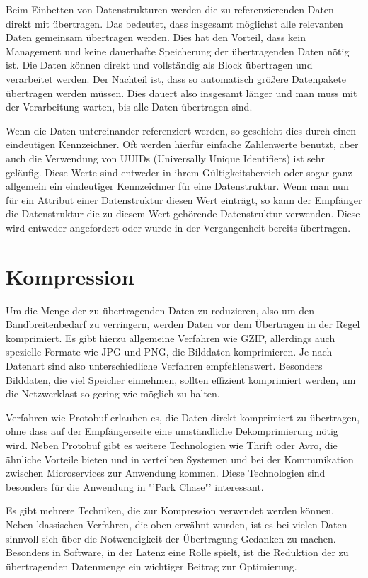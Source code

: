 Beim Einbetten von Datenstrukturen werden die zu referenzierenden Daten direkt mit übertragen. Das bedeutet, dass insgesamt möglichst alle relevanten Daten gemeinsam übertragen werden. Dies hat den Vorteil, dass kein Management und keine dauerhafte Speicherung der übertragenden Daten nötig ist. Die Daten können direkt und vollständig als Block übertragen und verarbeitet werden. Der Nachteil ist, dass so automatisch größere Datenpakete übertragen werden müssen. Dies dauert also insgesamt länger und man muss mit der Verarbeitung warten, bis alle Daten übertragen sind.

Wenn die Daten untereinander referenziert werden, so geschieht dies durch einen eindeutigen Kennzeichner. Oft werden hierfür einfache Zahlenwerte benutzt, aber auch die Verwendung von UUIDs (Universally Unique Identifiers) ist sehr geläufig. Diese Werte sind entweder in ihrem Gültigkeitsbereich oder sogar ganz allgemein ein eindeutiger Kennzeichner für eine Datenstruktur. Wenn man nun für ein Attribut einer Datenstruktur diesen Wert einträgt, so kann der Empfänger die Datenstruktur die zu diesem Wert gehörende Datenstruktur verwenden. Diese wird entweder angefordert oder wurde in der Vergangenheit bereits übertragen.

\section{Kompression}

Um die Menge der zu übertragenden Daten zu reduzieren, also um den Bandbreitenbedarf zu verringern, werden Daten vor dem Übertragen in der Regel komprimiert. Es gibt hierzu allgemeine Verfahren wie GZIP, allerdings auch spezielle Formate wie JPG und PNG, die Bilddaten komprimieren. Je nach Datenart sind also unterschiedliche Verfahren empfehlenswert. Besonders Bilddaten, die viel Speicher einnehmen, sollten effizient komprimiert werden, um die Netzwerklast so gering wie möglich zu halten.

Verfahren wie Protobuf erlauben es, die Daten direkt komprimiert zu übertragen, ohne dass auf der Empfängerseite eine umständliche Dekomprimierung nötig wird. Neben Protobuf gibt es weitere Technologien wie Thrift oder Avro, die ähnliche Vorteile bieten und in verteilten Systemen und bei der Kommunikation zwischen Microservices zur Anwendung kommen. Diese Technologien sind besonders für die Anwendung in "'Park Chase"' interessant.

Es gibt mehrere Techniken, die zur Kompression verwendet werden können. Neben klassischen Verfahren, die oben erwähnt wurden, ist es bei vielen Daten sinnvoll sich über die Notwendigkeit der Übertragung Gedanken zu machen. Besonders in Software, in der Latenz eine Rolle spielt, ist die Reduktion der zu übertragenden Datenmenge ein wichtiger Beitrag zur Optimierung.

